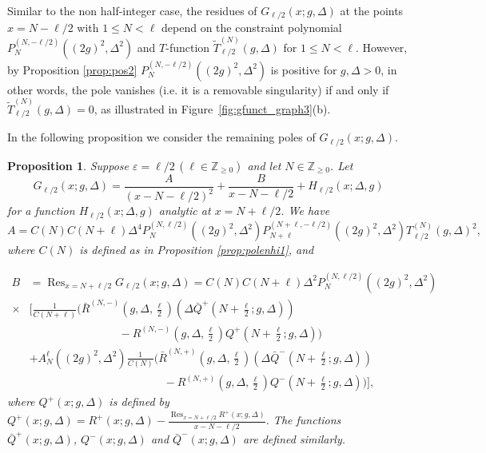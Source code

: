 \documentclass[11pt]{article}
\numberwithin{equation}{section}
\newcommand{\Z}{\mathbb{Z}} %
\newcommand{\e}{\varepsilon}
\newcommand{\cp}[2]{P^{(#1)}_{#2}} %
\DeclareMathOperator*{\Res}{Res} %
\theoremstyle{plain}
\newtheorem{prop}[thm]{Proposition}
\theoremstyle{definition}
\theoremstyle{remark}
\begin{document}
Similar to the non half-integer case, the residues of \(G_{\ell/2}(x;g,\Delta)\) at the points \(x = N - \ell/2  \) with \(1 \leq N < \ell\)  depend on the
constraint polynomial \(\cp{N,-\ell/2}{N}((2g)^2,\Delta^2)\) and $T$-function \(\tilde{T}^{(N)}_{\ell/2} (g,\Delta)\) for \(1 \leq N < \ell\). However, by
Proposition \ref{prop:pos2} \(\cp{N,-\ell/2}{N}((2g)^2,\Delta^2)\) is positive for \(g,\Delta>0\), in other words, the pole vanishes (i.e. it is a removable
singularity) if and only if \(\tilde{T}^{(N)}_{\ell/2} (g,\Delta)= 0\), as illustrated in Figure~\ref{fig:gfunct_graph3}(b).

In the following proposition we consider the remaining poles of \(G_{\ell/2}(x;g,\Delta)\).

\begin{prop} \label{prop:polehi}
  Suppose \(\e = \ell/2\, (\ell \in \Z_{\geq 0})\) and let \(N \in \Z_{\geq 0}\). Let
  \[
    G_{\ell/2}(x;g,\Delta) = \frac{A}{(x - N -\ell/2)^2} + \frac{B}{x - N -\ell/2} + H_{\ell/2}(x;\Delta,g)
  \]
  for a function \( H_{\ell/2}(x;\Delta,g) \) analytic at \(x = N + \ell/2 \).
  We have
  \[
    A = C(N)C(N+\ell) \Delta^4 \cp{N,\ell/2}{N}((2g)^2,\Delta^2) \cp{N+\ell,-\ell/2}{N+\ell}((2g)^2,\Delta^2) T^{(N)}_{\ell/2}(g,\Delta)^2,
  \]
  where \(C(N)\) is defined as in Proposition \ref{prop:polenhi1}, and

\begin{align*}
   B & =  \Res_{x = N + \ell/2}  G_{\ell/2}(x;g,\Delta) =  C(N) C(N+\ell) \Delta^2 \cp{N,\ell/2}{N}((2g)^2,\Delta^2)\\
  \times & \Big[ \frac{1}{C(N+\ell)}\Big( \bar{R}^{(N,-)}(g,\Delta,\frac{\ell}{2}) (\Delta \bar{Q}^+(N+\frac{\ell}{2};g,\Delta)) \\
  & \qquad \qquad \qquad \qquad - R^{(N,-)}(g,\Delta,\frac{\ell}{2})  Q^+(N+\frac{\ell}{2};g,\Delta) \Big) \\
     & +   A_N^{\ell}((2g)^2,\Delta^2) \frac{1}{C(N)} \Big( \bar{R}^{(N,+)}(g,\Delta,\frac{\ell}{2}) (\Delta\bar{Q}^-(N+\frac{\ell}{2};g,\Delta)) \\
     &\qquad \qquad \qquad \qquad \qquad \qquad -  R^{(N,+)}(g,\Delta,\frac{\ell}{2})  Q^-(N+\frac{\ell}{2};g,\Delta) \Big) \Big],
  \end{align*}
  where \(Q^{+}(x;g,\Delta) \) is defined by \(Q^{+}(x;g,\Delta) = R^{+}(x;g,\Delta) - \frac{\Res_{x=N+\ell/2} R^{+}(x;g,\Delta)}{x- N - \ell/2}\). The functions
  \(\bar{Q}^{+}(x;g,\Delta)\), \(Q^{-}(x;g,\Delta)\) and \(\bar{Q}^{-}(x;g,\Delta)  \) are defined similarly.
\end{prop}
\end{document}
